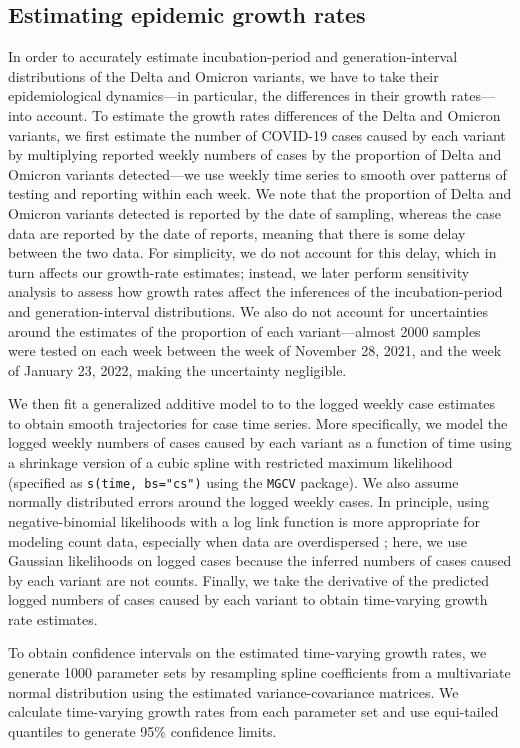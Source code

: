 \documentclass[12pt]{article}
\newcommand{\comment}{\showcomment}
\newcommand{\showcomment}[3]{\textcolor{#1}{\textbf{[#2: }\textsl{#3}\textbf{]}}}
\newcommand{\swp}[1]{\comment{magenta}{SWP}{#1}}
\begin{document}
\subsection{Estimating epidemic growth rates}

In order to accurately estimate incubation-period and generation-interval distributions of the Delta and Omicron variants, we have to take their epidemiological dynamics---in particular, the differences in their growth rates---into account.
To estimate the growth rates differences of the Delta and Omicron variants, we first estimate the number of COVID-19 cases caused by each variant by multiplying reported weekly numbers of cases by the proportion of Delta and Omicron variants detected---we use weekly time series to smooth over patterns of testing and reporting within each week. 
We note that the proportion of Delta and Omicron variants detected is reported by the date of sampling, whereas the case data are reported by the date of reports, meaning that there is some delay between the two data.
For simplicity, we do not account for this delay, which in turn affects our growth-rate estimates; 
instead, we later perform sensitivity analysis to assess how growth rates affect the inferences of the incubation-period and generation-interval distributions.
We also do not account for uncertainties around the estimates of the proportion of each variant---almost 2000 samples were tested on each week between the week of November 28, 2021, and the week of January 23, 2022, making the uncertainty negligible.

We then fit a generalized additive model \citep{wood2001mgcv} to to the logged weekly case estimates to obtain smooth trajectories for case time series.
More specifically, we model the logged weekly numbers of cases caused by each variant as a function of time using a shrinkage version of a cubic spline with restricted maximum likelihood (specified as \texttt{s(time, bs="cs")} using the \texttt{MGCV} package). 
We also assume normally distributed errors around the logged weekly cases.
In principle, using negative-binomial likelihoods with a log link function is more appropriate for modeling count data, especially when data are overdispersed \citep{ver2007quasi};
here, we use Gaussian likelihoods on logged cases because the inferred numbers of cases caused by each variant are not counts.
Finally, we take the derivative of the predicted logged numbers of cases caused by each variant to obtain time-varying growth rate estimates.

To obtain confidence intervals on the estimated time-varying growth rates, we generate 1000 parameter sets by resampling spline coefficients from a multivariate normal distribution using the estimated variance-covariance matrices.
We calculate time-varying growth rates from each parameter set and use equi-tailed quantiles to generate 95\% confidence limits. 
\end{document}
